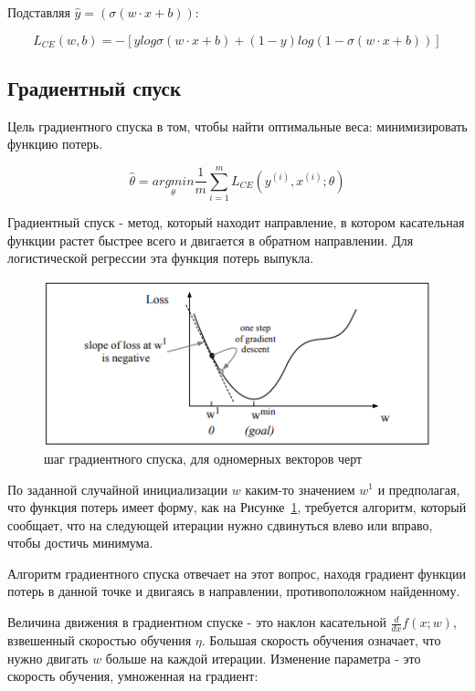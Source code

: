 \documentclass[a4paper,12pt,preview]{report} %
\begin{document}
	Подставляя $\hat{y} = (\sigma(w \cdot x + b))$:
	
	\begin{equation}
	L_{CE}(w, b) = -[y log \sigma(w \cdot x + b) + (1 - y) log(1 - \sigma(w \cdot x + b))]
	\end{equation}
	
	
	\subsection{Градиентный спуск}
	
	Цель градиентного спуска \cite{17} в том, чтобы найти оптимальные веса: минимизировать функцию потерь.
	
	\begin{equation}
	\hat{\theta} = \underset{\theta}{argmin} \dfrac{1}{m} \sum_{i=1}^{m} L_{CE} (y^{(i)}, x^{(i)}; \theta)
	\end{equation}
	
	Градиентный спуск - метод, который находит направление, в котором касательная функции растет быстрее всего и двигается в обратном направлении. Для логистической регрессии эта функция потерь выпукла.
	
	
	\begin{figure}[H]
		\centering\includegraphics[scale=0.9]{gradstep.PNG}
		\caption{шаг градиентного спуска, для одномерных векторов черт}
		\label{fig:gradstep}
	\end{figure}
	
	По заданной случайной инициализации $w$ каким-то значением $w^1$ и предполагая, что функция потерь имеет форму, как на Рисунке~\ref{fig:gradstep}, требуется алгоритм, который сообщает, что на следующей итерации нужно сдвинуться влево или вправо, чтобы достичь минимума.
	
	Алгоритм градиентного спуска отвечает на этот вопрос, находя градиент функции потерь в данной точке и двигаясь в направлении, противоположном найденному.
	
	Величина движения в градиентном спуске - это наклон касательной $\frac{d}{dx}f(x;w)$, взвешенный скоростью обучения $\eta$. Большая скорость обучения означает, что нужно двигать $w$ больше на каждой итерации. Изменение параметра - это скорость обучения, умноженная на градиент:
	
\end{document}
